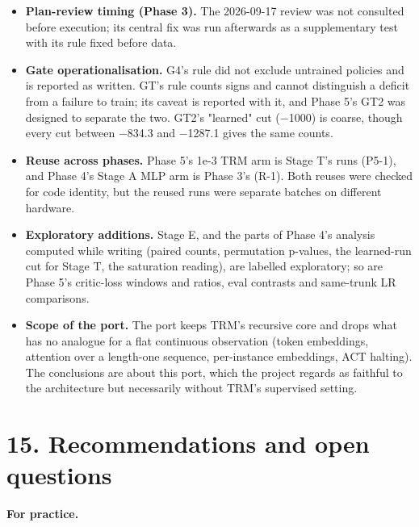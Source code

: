 \documentclass[11pt]{article}
\begin{document}
\begin{itemize}
\item \textbf{Plan-review timing (Phase 3).} The 2026-09-17 review was not consulted before execution; its central fix was run afterwards as a supplementary test with its rule fixed before data.
\item \textbf{Gate operationalisation.} G4's rule did not exclude untrained policies and is reported as written. GT's rule counts signs and cannot distinguish a deficit from a failure to train; its caveat is reported with it, and Phase 5's GT2 was designed to separate the two. GT2's "learned" cut ($-$1000) is coarse, though every cut between $-$834.3 and $-$1287.1 gives the same counts.
\item \textbf{Reuse across phases.} Phase 5's 1e-3 TRM arm is Stage T's runs (P5-1), and Phase 4's Stage A MLP arm is Phase 3's (R-1). Both reuses were checked for code identity, but the reused runs were separate batches on different hardware.
\item \textbf{Exploratory additions.} Stage E, and the parts of Phase 4's analysis computed while writing (paired counts, permutation p-values, the learned-run cut for Stage T, the saturation reading), are labelled exploratory; so are Phase 5's critic-loss windows and ratios, eval contrasts and same-trunk LR comparisons.
\item \textbf{Scope of the port.} The port keeps TRM's recursive core and drops what has no analogue for a flat continuous observation (token embeddings, attention over a length-one sequence, per-instance embeddings, ACT halting). The conclusions are about this port, which the project regards as faithful to the architecture but necessarily without TRM's supervised setting.
\end{itemize}



\medskip



\section*{15. Recommendations and open questions}



\textbf{For practice.}
\end{document}
